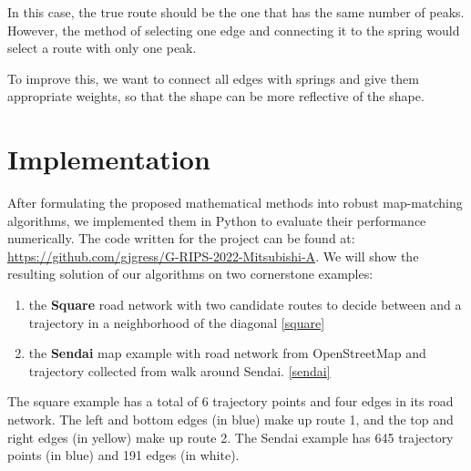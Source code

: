 \documentclass{article}
\numberwithin{equation}{section}
\theoremstyle{definition}
\begin{document}
\begin{itemize}
    
    In this case, the true route should be the one that has the same number of peaks. However, the method of selecting one edge and connecting it to the spring would select a route with only one peak.
    
    To improve this, we want to connect all edges with springs and give them appropriate weights, so that the shape can be more reflective of the shape.

\end{itemize}



\section{Implementation}
After formulating the proposed mathematical methods into robust map-matching algorithms, we implemented them in Python to evaluate their performance numerically. The code written for the project can be found at:  \url{https://github.com/gjgress/G-RIPS-2022-Mitsubishi-A}.
We will show the resulting solution of our algorithms on two cornerstone examples: 
\begin{enumerate}
    \item the \textbf{Square} road network with two candidate routes to decide between and a trajectory in a neighborhood of the diagonal \autoref{square}
    \item the \textbf{Sendai} map example with road network from OpenStreetMap and trajectory collected from walk around Sendai. \autoref{sendai}
\end{enumerate}
The square example has a total of 6 trajectory points and four edges in its road network. The left and bottom edges (in blue) make up route 1, and the top and right edges (in yellow) make up route 2. The Sendai example has 645 trajectory points (in blue) and 191 edges (in white).
\end{document}
